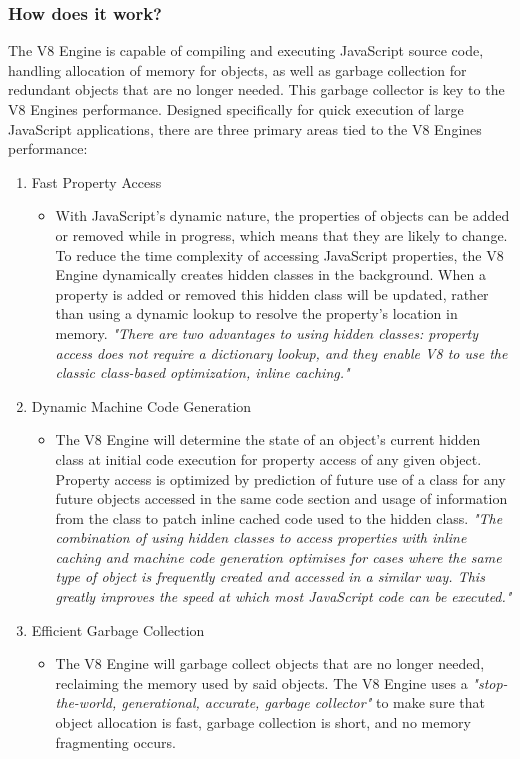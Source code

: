 	\subsubsection{How does it work?}
    The V8 Engine is capable of compiling and executing JavaScript source code, handling allocation of memory for objects, as well as garbage collection for redundant objects that are no longer needed. This garbage collector is key to the V8 Engines performance. Designed specifically for quick execution of large JavaScript applications, there are three primary areas tied to the V8 Engines performance: 
    \begin{enumerate}
    \item Fast Property Access
    	\begin{itemize}
    	\item With JavaScript's dynamic nature, the properties of objects can be added or removed while in progress, which means that they are likely to change. To reduce the time complexity of accessing JavaScript properties, the V8 Engine dynamically creates hidden classes in the background. When a property is added or removed this hidden class will be updated, rather than using a dynamic lookup to resolve the property's location in memory\cite{googleV8}. \emph{"There are two advantages to using hidden classes: property access does not require a dictionary lookup, and they enable V8 to use the classic class-based optimization, inline caching."}\cite{googleV8} 
    	\end{itemize}
    \item Dynamic Machine Code Generation
    	\begin{itemize}
    	\item The V8 Engine will determine the state of an object's current hidden class at initial code execution for property access of any given object. Property access is optimized by prediction of future use of a class for any future objects accessed in the same code section and usage of information from the class to patch inline cached code used to the hidden class\cite{googleV8}. \emph{"The combination of using hidden classes to access properties with inline caching and machine code generation optimises for cases where the same type of object is frequently created and accessed in a similar way. This greatly improves the speed at which most JavaScript code can be executed."}\cite{googleV8}
    	\end{itemize}
    \item Efficient Garbage Collection
    	\begin{itemize}
    	\item The V8 Engine will garbage collect objects that are no longer needed, reclaiming the memory used by said objects. The V8 Engine uses a \emph{"stop-the-world, generational, accurate, garbage collector"}\cite{googleV8} to make sure that object allocation is fast, garbage collection is short, and no memory fragmenting occurs.
    	\end{itemize}
    \end{enumerate}
    
